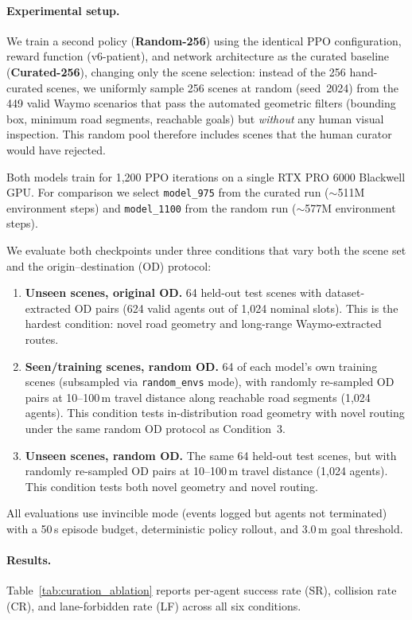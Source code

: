 \paragraph{Experimental setup.}
We train a second policy (\textbf{Random-256}) using the identical PPO configuration, reward function (v6-patient), and network architecture as the curated baseline (\textbf{Curated-256}), changing only the scene selection:
instead of the 256 hand-curated scenes, we uniformly sample 256 scenes at random (seed~2024) from the 449 valid Waymo scenarios that pass the automated geometric filters (bounding box, minimum road segments, reachable goals) but \emph{without} any human visual inspection.
This random pool therefore includes scenes that the human curator would have rejected.

Both models train for 1{,}200 PPO iterations on a single RTX PRO 6000 Blackwell GPU.
For comparison we select \texttt{model\_975} from the curated run ($\sim$511M environment steps) and \texttt{model\_1100} from the random run ($\sim$577M environment steps).

We evaluate both checkpoints under three conditions that vary both the scene set and the origin--destination (OD) protocol:
%
\begin{enumerate}[leftmargin=*, itemsep=1pt]
  \item \textbf{Unseen scenes, original OD.}
        64 held-out test scenes with dataset-extracted OD pairs (624 valid agents out of 1{,}024 nominal slots).
        This is the hardest condition: novel road geometry and long-range Waymo-extracted routes.
  \item \textbf{Seen/training scenes, random OD.}
        64 of each model's own training scenes (subsampled via \texttt{random\_envs} mode), with randomly re-sampled OD pairs at 10--100\,m travel distance along reachable road segments (1{,}024 agents).
        This condition tests in-distribution road geometry with novel routing under the same random OD protocol as Condition~3.
  \item \textbf{Unseen scenes, random OD.}
        The same 64 held-out test scenes, but with randomly re-sampled OD pairs at 10--100\,m travel distance (1{,}024 agents).
        This condition tests both novel geometry and novel routing.
\end{enumerate}
%
All evaluations use invincible mode (events logged but agents not terminated) with a 50\,s episode budget, deterministic policy rollout, and 3.0\,m goal threshold.

\paragraph{Results.}
Table~\ref{tab:curation_ablation} reports per-agent success rate (SR), collision rate (CR), and lane-forbidden rate (LF) across all six conditions.

